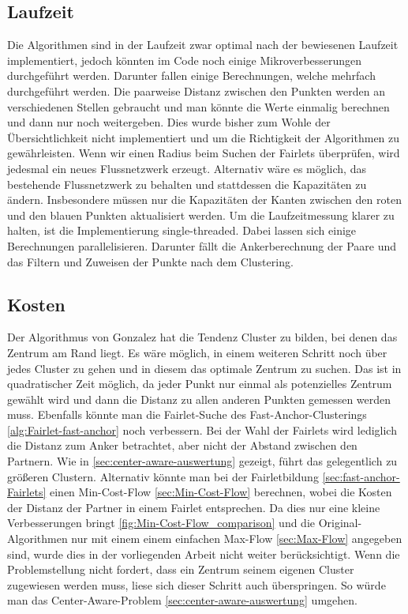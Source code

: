     \subsection{Laufzeit}
        Die Algorithmen sind in der Laufzeit zwar optimal nach der bewiesenen Laufzeit implementiert, jedoch könnten im Code noch einige Mikroverbesserungen durchgeführt werden. Darunter fallen einige Berechnungen, welche mehrfach durchgeführt werden. Die paarweise Distanz zwischen den Punkten werden an verschiedenen Stellen gebraucht und man könnte die Werte einmalig berechnen und dann nur noch weitergeben. Dies wurde bisher zum Wohle der Übersichtlichkeit nicht implementiert und um die Richtigkeit der Algorithmen zu gewährleisten. \newline
        Wenn wir einen Radius beim Suchen der Fairlets \glqq überprüfen\grqq, wird jedesmal ein neues Flussnetzwerk erzeugt. Alternativ wäre es möglich, das bestehende Flussnetzwerk zu behalten und stattdessen die Kapazitäten zu ändern. Insbesondere müssen nur die Kapazitäten der Kanten zwischen den roten und den blauen Punkten aktualisiert werden. \newline
        Um die Laufzeitmessung klarer zu halten, ist die Implementierung single-threaded. Dabei lassen sich einige Berechnungen parallelisieren. Darunter fällt die Ankerberechnung der Paare und das Filtern und Zuweisen der Punkte nach dem Clustering.

    \subsection{Kosten}
        Der Algorithmus von Gonzalez \cite{GONZALEZ1985293} hat die Tendenz Cluster zu bilden, bei denen das Zentrum am Rand liegt. Es wäre möglich, in einem weiteren Schritt noch über jedes Cluster zu gehen und in diesem das optimale Zentrum zu suchen. Das ist in quadratischer Zeit möglich, da jeder Punkt nur einmal als potenzielles Zentrum gewählt wird und dann die Distanz zu allen anderen Punkten gemessen werden muss. \newline
        Ebenfalls könnte man die Fairlet-Suche des Fast-Anchor-Clusterings \ref{alg:Fairlet-fast-anchor} noch verbessern. Bei der Wahl der Fairlets wird lediglich die Distanz zum Anker betrachtet, aber nicht der Abstand zwischen den Partnern. Wie in \ref{sec:center-aware-auswertung} gezeigt, führt das gelegentlich zu größeren Clustern. Alternativ könnte man bei der Fairletbildung \ref{sec:fast-anchor-Fairlets} einen Min-Cost-Flow \ref{sec:Min-Cost-Flow} berechnen, wobei die Kosten der Distanz der Partner in einem Fairlet entsprechen. Da dies nur eine kleine Verbesserungen bringt \ref{fig:Min-Cost-Flow_comparison} und die Original-Algorithmen \cite{BA_Clustering_Irina} nur mit einem einem einfachen Max-Flow \ref{sec:Max-Flow} angegeben sind, wurde dies in der vorliegenden Arbeit nicht weiter berücksichtigt. \newline
        Wenn die Problemstellung nicht fordert, dass ein Zentrum seinem eigenen Cluster zugewiesen werden muss, liese sich dieser Schritt auch überspringen. So würde man das Center-Aware-Problem \ref{sec:center-aware-auswertung} umgehen.

